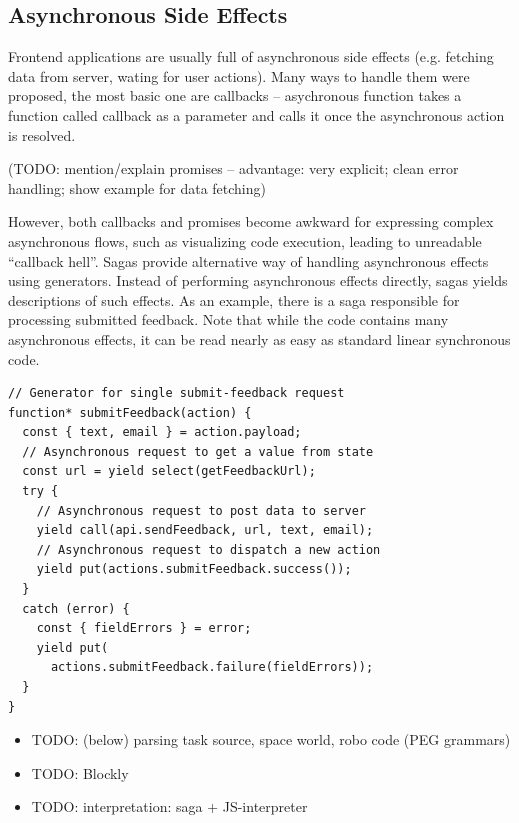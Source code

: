 \subsection{Asynchronous Side Effects}

Frontend applications are usually full of asynchronous side effects
(e.g. fetching data from server, wating for user actions).
Many ways to handle them were proposed, the most basic one are callbacks --
asychronous function takes a function called callback as a parameter
and calls it once the asynchronous action is resolved.

(TODO: mention/explain promises -- advantage: very explicit; clean error
handling; show example for data fetching)

However, both callbacks and promises become awkward for expressing complex
asynchronous flows, such as visualizing code execution,
leading to unreadable ``callback hell''. %
Sagas provide alternative way of handling asynchronous effects using generators.
Instead of performing asynchronous effects directly, sagas yields
descriptions of such effects.
As an example, there is a saga responsible for processing
submitted feedback.
Note that while the code contains many asynchronous effects,
it can be read nearly as easy as standard linear synchronous code.


\begin{lstlisting}[language=ES6]
// Generator for single submit-feedback request
function* submitFeedback(action) {
  const { text, email } = action.payload;
  // Asynchronous request to get a value from state
  const url = yield select(getFeedbackUrl);
  try {
    // Asynchronous request to post data to server
    yield call(api.sendFeedback, url, text, email);
    // Asynchronous request to dispatch a new action
    yield put(actions.submitFeedback.success());
  }
  catch (error) {
    const { fieldErrors } = error;
    yield put(
      actions.submitFeedback.failure(fieldErrors));
  }
}
\end{lstlisting}



\begin{itemize}
\item TODO: (below) parsing task source, space world, robo code (PEG grammars)
\item TODO: Blockly
\item TODO: interpretation: saga + JS-interpreter
\end{itemize}

